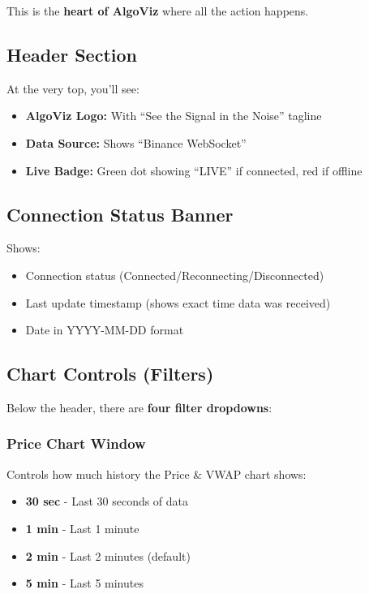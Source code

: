 \documentclass[12pt,a4paper]{article}
\begin{document}
This is the \textbf{heart of AlgoViz} where all the action happens.

\subsection{Header Section}

At the very top, you'll see:
\begin{itemize}
    \item \textbf{AlgoViz Logo:} With ``See the Signal in the Noise'' tagline
    \item \textbf{Data Source:} Shows ``Binance WebSocket''
    \item \textbf{Live Badge:} Green dot showing ``LIVE'' if connected, red if offline
\end{itemize}

\subsection{Connection Status Banner}
Shows:
\begin{itemize}
    \item Connection status (Connected/Reconnecting/Disconnected)
    \item Last update timestamp (shows exact time data was received)
    \item Date in YYYY-MM-DD format
\end{itemize}

\subsection{Chart Controls (Filters)}

Below the header, there are \textbf{four filter dropdowns}:

\subsubsection{Price Chart Window}
Controls how much history the Price \& VWAP chart shows:
\begin{itemize}
    \item \textbf{30 sec} - Last 30 seconds of data
    \item \textbf{1 min} - Last 1 minute
    \item \textbf{2 min} - Last 2 minutes (default)
    \item \textbf{5 min} - Last 5 minutes
\end{itemize}
\end{document}
